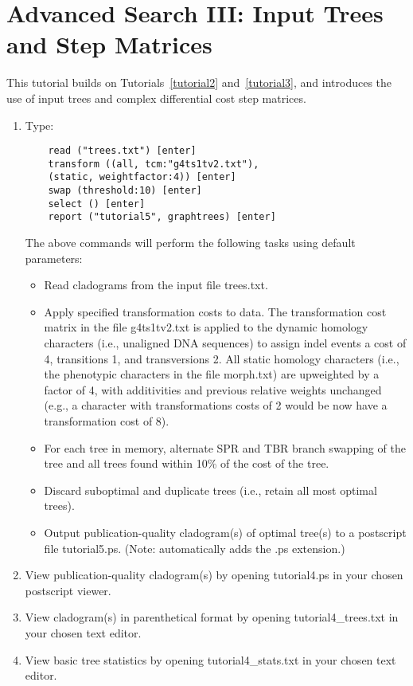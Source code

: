 \section[Trees and Step Matrices]{Advanced Search III: Input Trees and Step
Matrices}{\label{tutorial4}}

This tutorial builds on Tutorials~\ref{tutorial2} and~\ref{tutorial3}, and introduces the use of input trees 
and complex differential cost step matrices.

\begin{enumerate}
\item Type: 
    \begin{verbatim}
    read ("trees.txt") [enter]
    transform ((all, tcm:"g4ts1tv2.txt"), 
    (static, weightfactor:4)) [enter]
    swap (threshold:10) [enter]
    select () [enter]
    report ("tutorial5", graphtrees) [enter]
    \end{verbatim}

The above commands will perform the following tasks using default parameters:
\begin{itemize}
\item Read cladograms from the input file trees.txt.
\item Apply specified transformation costs to data. The transformation cost 
matrix in the file g4ts1tv2.txt is applied to the dynamic homology 
characters (i.e., unaligned DNA sequences) to assign indel events a cost 
of 4, transitions 1, and transversions 2. All static homology characters 
(i.e., the phenotypic characters in the file morph.txt) are upweighted by 
a factor of 4, with additivities and previous relative weights unchanged 
(e.g., a character with transformations costs of 2 would be now have a 
transformation cost of 8).
\item For each tree in memory, alternate SPR and TBR branch swapping of the tree 
and all trees found within 10\% of the cost of the tree.
\item Discard suboptimal and duplicate trees (i.e., retain all most optimal 
trees).
\item Output publication-quality cladogram(s) of optimal tree(s) to a postscript 
file tutorial5.ps. (Note: \poy automatically adds the .ps extension.)  
\end{itemize}

\item View publication-quality cladogram(s) by opening tutorial4.ps in your chosen 
postscript viewer.
\item View cladogram(s) in parenthetical format by opening tutorial4\_trees.txt in 
your chosen text editor.
\item View basic tree statistics by opening tutorial4\_stats.txt in your chosen 
text editor.
\end{enumerate}

